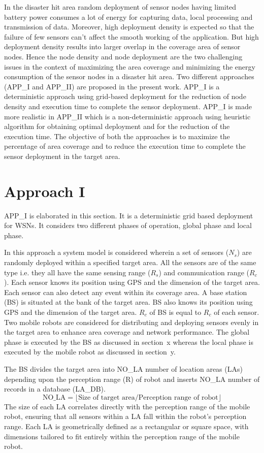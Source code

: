 \documentclass{article}
\begin{document}
In the disaster hit area random deployment of sensor nodes having limited battery power consumes a lot of energy for capturing data, local processing and transmission of data. Moreover, high deployment density is expected so that the failure of few sensors can’t affect the smooth working of the application. But high deployment density results into larger overlap in the coverage area of sensor nodes. Hence the node density and node deployment are the two challenging issues in the context of maximizing the area coverage and minimizing the energy consumption of the sensor nodes in a disaster hit area. Two different approaches (APP\_I and APP\_II) are proposed in the present work. APP\_I is a deterministic approach using grid-based deployment for the reduction of node density and execution time to complete the sensor deployment. APP\_I is made more realistic in APP\_II which is a non-deterministic approach using heuristic algorithm for obtaining optimal deployment and for the reduction of the execution time. The objective of both the approaches is to maximize the percentage of area coverage and to reduce the execution time to complete the sensor deployment in the target area.

\section*{Approach I}

APP\_I is elaborated in this section. It is a deterministic grid based deployment for WSNs. It considers two different phases of operation, global phase and local phase.

In this approach a system model is considered wherein a set of sensors ($N_s$) are randomly deployed within a specified target area. All the sensors are of the same type i.e. they all have the same sensing range ($R_s$) and communication range ($R_c$). Each sensor knows its position using GPS and the dimension of the target area. Each sensor can also detect any event within its coverage area. A base station (BS) is situated at the bank of the target area. BS also knows its position using GPS and the dimension of the target area. $R_c$ of BS is equal to $R_c$ of each sensor. Two mobile robots are considered for distributing and deploying sensors evenly in the target area to enhance area coverage and network performance. The global phase is executed by the BS as discussed in section~x whereas the local phase is executed by the mobile robot as discussed in section~y.

The BS divides the target area into NO\_LA number of location areas (LAs) depending upon the perception range (R) of robot and inserts NO\_LA number of records in a database (LA\_DB).
\[
\text{NO\_LA} = \lfloor \text{Size of target area} / \text{Perception range of robot} \rfloor
\]
The size of each LA correlates directly with the perception range of the mobile robot, ensuring that all sensors within a LA fall within the robot's perception range. Each LA is geometrically defined as a rectangular or square space, with dimensions tailored to fit entirely within the perception range of the mobile robot.
\end{document}
